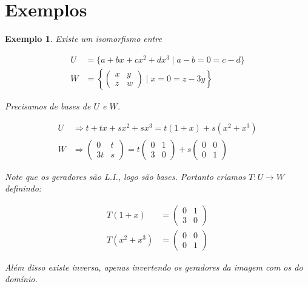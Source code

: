 \documentclass{article}
\newcommand{\deffunc}[3] {#1: #2 \longrightarrow #3}
\newtheorem{example}{Exemplo}[section]
\begin{document}
    \section{Exemplos}
        \begin{example}
            Existe um isomorfismo entre

            \begin{align*}
                U &= \{a + bx + cx^2 + dx^3 \mid a - b = 0 = c - d\}\\
                W &= \left\{ \begin{pmatrix}x&y\\z&w\end{pmatrix} \mid x = 0 = z - 3y \right\}
            \end{align*}

            Precisamos de bases de $U$ e $W$.

            \begin{align*}
                U &\Rightarrow t + tx + sx^2 + sx^3 = t(1 + x) + s(x^2 + x^3)\\
                W &\Rightarrow \begin{pmatrix}0&t\\3t&s\end{pmatrix} =
                    t\begin{pmatrix}0&1\\3&0\end{pmatrix} + s\begin{pmatrix}0&0\\0&1\end{pmatrix}
            \end{align*}
            
            Note que os geradores são L.I., logo são bases. Portanto criamos $\deffunc{T}{U}{W}$ definindo:

            \begin{align*}
                T(1 + x) &= \begin{pmatrix}0&1\\3&0\end{pmatrix}\\
                T(x^2 + x^3) &= \begin{pmatrix}0&0\\0&1\end{pmatrix}
            \end{align*}

            Além disso existe inversa, apenas invertendo os geradores da imagem com os do domínio.
        \end{example}
\end{document}
